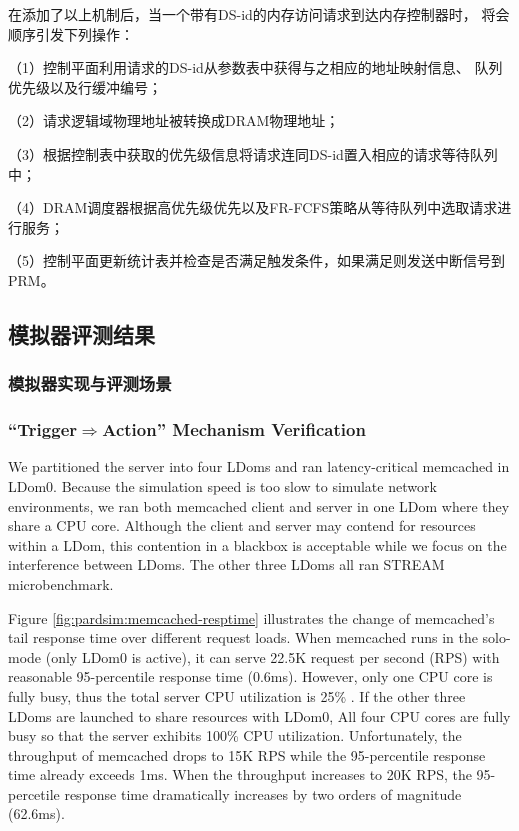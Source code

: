 在添加了以上机制后，当一个带有DS-id的内存访问请求到达内存控制器时，
将会顺序引发下列操作：

（1）控制平面利用请求的DS-id从参数表中获得与之相应的地址映射信息、
队列优先级以及行缓冲编号；

（2）请求逻辑域物理地址被转换成DRAM物理地址；

（3）根据控制表中获取的优先级信息将请求连同DS-id置入相应的请求等待队列中；

（4）DRAM调度器根据高优先级优先以及FR-FCFS\cite{rixner_memory_2000}策略从等待队列中选取请求进行服务；

（5）控制平面更新统计表并检查是否满足触发条件，如果满足则发送中断信号到PRM。

\subsection{模拟器评测结果}

\subsubsection{模拟器实现与评测场景}

\subsubsection{``Trigger$\Rightarrow$Action'' Mechanism Verification}

We partitioned the server into four LDoms and ran latency-critical memcached
in LDom0. Because the simulation speed is too slow to simulate
network environments, we ran both memcached
client and server in one LDom where they share a CPU core. Although
the client and server may contend for resources within a LDom, this contention
in a blackbox is acceptable while we focus on the interference between LDoms.
The other three LDoms all ran STREAM microbenchmark.

Figure \ref{fig:pardsim:memcached-resptime} illustrates the change of
memcached's tail response time over different request loads.
When memcached runs in the solo-mode (only LDom0 is active),
it can serve 22.5K request per
second (RPS) with reasonable 95-percentile response time (0.6ms). However,
only one CPU core is fully busy, thus the total server CPU utilization is 25\% .
If the other three LDoms are launched to share resources with LDom0,
All four CPU cores are fully busy so that the server exhibits 100\% CPU utilization.
Unfortunately, the throughput of memcached drops to 15K RPS while
the 95-percentile response time already exceeds 1ms. When 
the throughput increases to 20K RPS, the 95-percetile response time
dramatically increases by two orders of magnitude (62.6ms). 


